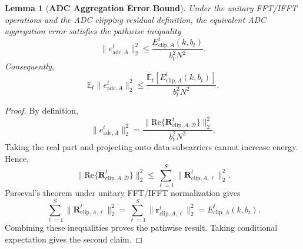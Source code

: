 \documentclass[conference]{IEEEtran}
\newtheorem{lemma}{Lemma}
\begin{document}
\begin{lemma}[\bf ADC Aggregation Error Bound]
    \label{lemma:adc_error}
    Under the unitary FFT/IFFT operations and the ADC clipping residual definition, the equivalent ADC aggregation error satisfies the pathwise inequality
    \begin{equation}
        \|e_{\mathrm{adc},A}^t\|_2^2
        \le
        \frac{E_{\mathrm{clip},A}^t(k,b_t)}{b_t^2N^2}.
    \end{equation}
    Consequently,
    \begin{equation}
        \mathbb{E}_t\|e_{\mathrm{adc},A}^t\|_2^2
        \le
        \frac{\mathbb{E}_t[E_{\mathrm{clip},A}^t(k,b_t)]}{b_t^2N^2}.
    \end{equation}
\end{lemma}
\begin{proof}
    By definition,
    \begin{equation}
        \|e_{\mathrm{adc},A}^t\|_2^2
        =\frac{\|\mathrm{Re}\{\mathbf{R}_{\mathrm{clip},A,\mathcal{D}}^t\}\|_2^2}{b_t^2N^2}.
    \end{equation}
    Taking the real part and projecting onto data subcarriers cannot increase energy. Hence,
    \begin{equation}
        \|\mathrm{Re}\{\mathbf{R}_{\mathrm{clip},A,\mathcal{D}}^t\}\|_2^2
        \le
        \sum_{\ell=1}^{S}\|\mathbf{R}_{\mathrm{clip},A,\ell}^t\|_2^2.
    \end{equation}
    Parseval's theorem under unitary FFT/IFFT normalization gives
    \begin{equation}
        \sum_{\ell=1}^{S}\|\mathbf{R}_{\mathrm{clip},A,\ell}^t\|_2^2
        =\sum_{\ell=1}^{S}\|\mathbf{r}_{\mathrm{clip},A,\ell}^t\|_2^2
        =E_{\mathrm{clip},A}^t(k,b_t).
    \end{equation}
    Combining these inequalities proves the pathwise result. Taking conditional expectation gives the second claim.
\end{proof}
\end{document}

